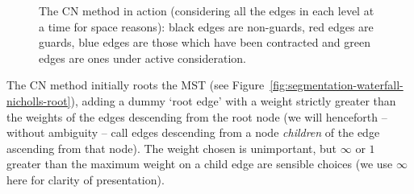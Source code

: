 \documentclass[preprint,a4paper]{elsarticle}
\newenvironment{stusubfig}[1]
{
	\begin{figure}[#1]
	\begin{center}
}
{
	\end{center}
	\end{figure}
}
\begin{document}
\begin{stusubfig}{p}
	\hspace{4mm}%
	\hspace{4mm}%
\caption[The CN method in action]{The CN method in action (considering all the edges in each level at a time for space reasons): black edges are non-guards, red edges are guards, blue edges are those which have been contracted and green edges are ones under active consideration.}
\label{fig:segmentation-waterfall-nicholls-example}
\end{stusubfig}

The CN method initially roots the MST (see Figure~\ref{fig:segmentation-waterfall-nicholls-root}), adding a dummy `root edge' with a weight strictly greater than the weights of the edges descending from the root node (we will henceforth -- without ambiguity -- call edges descending from a node \emph{children} of the edge ascending from that node). The weight chosen is unimportant, but $\infty$ or $1$ greater than the maximum weight on a child edge are sensible choices (we use $\infty$ here for clarity of presentation).
\end{document}
